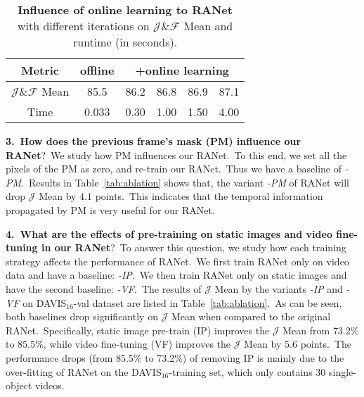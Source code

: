 \documentclass[10pt,twocolumn,letterpaper]{article}
\begin{document}
\begin{table}[t]
\vspace{1mm}
\centering
    \begin{tabular}{c||c|cccc}
    \Xhline{1pt}
\rowcolor[rgb]{ .873,  .91,  0.95}
    Metric & offline & \multicolumn{4}{c}{+online learning}
    \\
    \hline
    \hline
$\mathcal{J}$\&$\mathcal{F}$ Mean & 85.5 & 86.2 & 86.8 & 86.9 & 87.1 \\
    Time & 0.033 & 0.30 & 1.00 & 1.50 & 4.00 
    \\
    \hline
    \end{tabular}\vspace{-3mm}
    \caption{\textbf{Influence of online learning to RANet} with different iterations on $\mathcal{J}$\&$\mathcal{F}$ Mean and runtime (in seconds).} 
\label{tab:online}\vspace{-4mm}
\end{table}

\noindent
\textbf{3.\ How does the previous frame's mask (PM) influence our RANet}?\ 
We study how PM influences our RANet.\ To this end, we set all the pixels of the PM as zero, and re-train our RANet.\ Thus we have a baseline of \emph{-PM}.\ Results in Table~\ref{tab:ablation} shows that, the variant \emph{-PM} of RANet will drop $\mathcal{J}$ Mean by $4.1$ points.\ This indicates that the temporal information propagated by PM is very useful for our RANet.





\noindent
\textbf{4.\ What are the effects of pre-training on static images and video fine-tuning in our RANet}?\
To answer this question, we study how each training strategy affects the performance of RANet.\ We first train RANet only on video data and have a baseline: \emph{-IP}.\ We then train RANet only on static images and have the second baseline: \emph{-VF}.\ The results of $\mathcal{J}$ Mean by the variants \emph{-IP} and \emph{-VF} on DAVIS$_{16}$-val dataset are listed in Table~\ref{tab:ablation}.\ As can be seen, both baselines drop significantly on $\mathcal{J}$ Mean when compared to the original RANet.\ Specifically, static image pre-train (IP) improves the $\mathcal{J}$ Mean from $73.2\%$ to $85.5\%$, while video fine-tuning (VF) improves the $\mathcal{J}$ Mean by $5.6$ points.\ The performance drops (from 85.5\% to 73.2\%) of removing IP is mainly due to the over-fitting of RANet on the DAVIS$_{16}$-training set, which only contains 30 single-object videos.
\end{document}
